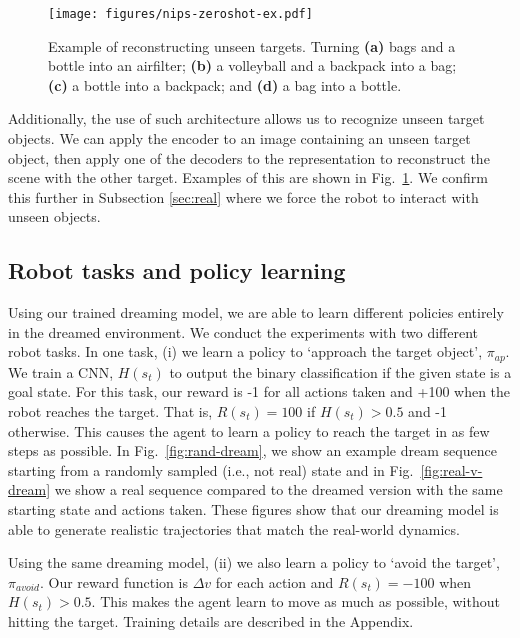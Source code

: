\documentclass[letterpaper, 10 pt, conference]{ieeeconf}
\begin{document}
\begin{figure}
    \centering
      \texttt{[image: figures/nips-zeroshot-ex.pdf]}
      \caption{Example of reconstructing unseen targets. Turning \textbf{(a)} bags and a bottle into an airfilter; \textbf{(b)} a volleyball and a backpack into a bag; \textbf{(c)} a bottle into a backpack; and \textbf{(d)} a bag into a bottle.}
      \label{fig:zeroshot-example}
\end{figure}


Additionally, the use of such architecture allows us to recognize unseen target objects. We can apply the encoder to an image containing an unseen target object, then apply one of the decoders to the representation to reconstruct the scene with the other target. Examples of this are shown in Fig.~\ref{fig:zeroshot-example}. We confirm this further in Subsection \ref{sec:real} where we force the robot to interact with unseen objects.




\subsection{Robot tasks and policy learning}
Using our trained dreaming model, we are able to learn different policies entirely in the dreamed environment. We conduct the experiments with two different robot tasks. In one task, (i) we learn a policy to `approach the target object', $\pi_{ap}$. We train a CNN, $H(s_t)$ to output the binary classification if the given state is a goal state. 
For this task, our reward is -1 for all actions taken and +100 when the robot reaches the target. That is, $R(s_t) = 100$ if $H(s_t) > 0.5$ and -1 otherwise.
 This causes the agent to learn a policy to reach the target in as few steps as possible.
 In Fig.~\ref{fig:rand-dream}, we show an example dream sequence starting from a randomly sampled (i.e., not real) state and in Fig.~\ref{fig:real-v-dream} we show a real sequence compared to the dreamed version with the same starting state and actions taken. These figures show that our dreaming model is able to generate realistic trajectories that match the real-world dynamics.




Using the same dreaming model, (ii) we also learn a policy to `avoid the target', $\pi_{avoid}$. Our reward function is $\Delta v$ for each action and $R(s_t) = -100$ when $H(s_t) > 0.5$. This makes the agent learn to move as much as possible, without hitting the target. Training details are described in the Appendix.
\end{document}
